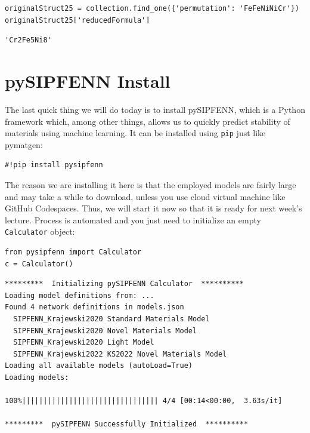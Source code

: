 \begin{verbatim}
originalStruct25 = collection.find_one({'permutation': 'FeFeNiNiCr'})
originalStruct25['reducedFormula']
\end{verbatim}

\begin{verbatim}
'Cr2Fe5Ni8'
\end{verbatim}

\hypertarget{pysipfenn-install}{%
\section{pySIPFENN Install}\label{pysipfenntutorial:pysipfenn-install}}

The last quick thing we will do today is to install pySIPFENN, which is
a Python framework which, among other things, allows us to quickly
predict stability of materials using machine learning. It can be
installed using \texttt{pip} just like pymatgen:

\begin{verbatim}
#!pip install pysipfenn
\end{verbatim}

The reason we are installing it here is that the employed models are
fairly large and may take a while to download, unless you use cloud
virtual machine like GitHub Codespaces. Thus, we will start it now so
that it is ready for next week's lecture. Process is automated and you
just need to initialize an empty \texttt{Calculator}
object:

\begin{verbatim}
from pysipfenn import Calculator
c = Calculator()
\end{verbatim}

\begin{verbatim}
*********  Initializing pySIPFENN Calculator  **********
Loading model definitions from: ...
Found 4 network definitions in models.json
  SIPFENN_Krajewski2020 Standard Materials Model
  SIPFENN_Krajewski2020 Novel Materials Model
  SIPFENN_Krajewski2020 Light Model
  SIPFENN_Krajewski2022 KS2022 Novel Materials Model
Loading all available models (autoLoad=True)
Loading models:

100%|||||||||||||||||||||||||||||||| 4/4 [00:14<00:00,  3.63s/it]

*********  pySIPFENN Successfully Initialized  **********
\end{verbatim}

